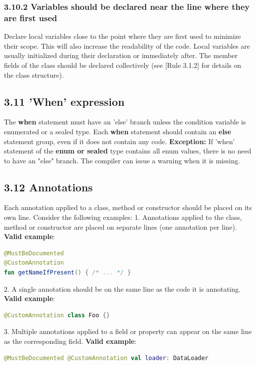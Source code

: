 \subsubsection*{\textbf{3.10.2 Variables should be declared near the line where they are first used}}
\leavevmode\newline
\label{sec:3.10.2}
Declare local variables close to the point where they are first used to minimize their scope. This will also increase the readability of the code.
Local variables are usually initialized during their declaration or immediately after.
The member fields of the class should be declared collectively (see [Rule 3.1.2] for details on the class structure).
\subsection*{\textbf{3.11 'When' expression}}
\label{sec:3.11}
The \textbf{when} statement must have an 'else' branch unless the condition variable is enumerated or a sealed type.
Each \textbf{when} statement should contain an \textbf{else} statement group, even if it does not contain any code.
\textbf{Exception:} If 'when' statement of the \textbf{enum or sealed} type contains all enum values, there is no need to have an "else" branch.
The compiler can issue a warning when it is missing.
\subsection*{\textbf{3.12 Annotations}}
\label{sec:3.12}
Each annotation applied to a class, method or constructor should be placed on its own line. Consider the following examples:
1. Annotations applied to the class, method or constructor are placed on separate lines (one annotation per line).
\textbf{Valid example}:
\begin{lstlisting}[language=Kotlin]
@MustBeDocumented
@CustomAnnotation
fun getNameIfPresent() { /* ... */ }
\end{lstlisting}
2. A single annotation should be on the same line as the code it is annotating.
\textbf{Valid example}:
\begin{lstlisting}[language=Kotlin]
@CustomAnnotation class Foo {}
\end{lstlisting}
3. Multiple annotations applied to a field or property can appear on the same line as the corresponding field.
\textbf{Valid example}:
\begin{lstlisting}[language=Kotlin]
@MustBeDocumented @CustomAnnotation val loader: DataLoader
\end{lstlisting}
